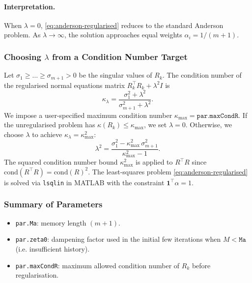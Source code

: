 \documentclass[a4paper,12pt]{article}
\newcommand{\code}[1]{\texttt{#1}}
\begin{document}
\paragraph{Interpretation.}  
When $\lambda = 0$, \eqref{eq:anderson-regularised} reduces to the standard Anderson problem.  
As $\lambda \to \infty$, the solution approaches equal weights $\alpha_i = 1/(m+1)$.

\subsubsection{Choosing $\lambda$ from a Condition Number Target}
Let $\sigma_1 \ge \dots \ge \sigma_{m+1} > 0$ be the singular values of $R_k$.  
The condition number of the regularised normal equations matrix $R_k^\top R_k + \lambda^2 I$ is
\[
    \kappa_{\lambda} = \frac{\sigma_1^2 + \lambda^2}{\sigma_{m+1}^2 + \lambda^2}.
\]
We impose a user-specified maximum condition number $\kappa_{\max} = \texttt{par.maxCondR}$.  
If the unregularised problem has $\kappa(R_k) \le \kappa_{\max}$, we set $\lambda = 0$.  
Otherwise, we choose $\lambda$ to achieve $\kappa_\lambda = \kappa_{\max}^2$:
\begin{equation}
\label{eq:lambda-choice}
    \lambda^2 = \frac{\sigma_1^2 - \kappa_{\max}^2 \, \sigma_{m+1}^2}{\kappa_{\max}^2 - 1}.
\end{equation}
The squared condition number bound $\kappa_{\max}^2$ is applied to $R^\top R$ since $\mathrm{cond}(R^\top R) = \mathrm{cond}(R)^2$. The least-squares problem \eqref{eq:anderson-regularised} is solved via \texttt{lsqlin} in MATLAB with the constraint $\mathbf{1}^\top \alpha = 1$.

\subsubsection{Summary of Parameters}
\begin{itemize}
    \item \code{par.Ma}: memory length $(m+1)$.
    \item \code{par.zeta0}: dampening factor used in the initial few iterations when $M < \texttt{Ma}$ (i.e. insufficient history).
    \item \code{par.maxCondR}: maximum allowed condition number of $R_k$ before regularisation.
\end{itemize}
\end{document}
